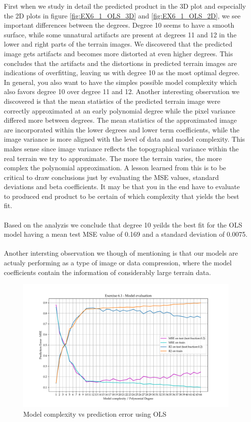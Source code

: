 \documentclass[11pt, a4paper]{article}
\begin{document}
First when we study in detail the predicted product in the 3D plot and especially the 2D plots in figure \ref{fig:EX6_1_OLS_3D} and \ref{fig:EX6_1_OLS_2D}, we see important differences between the degrees.
Degree 10 seems to have a smooth surface, while some unnatural artifacts are present at degrees 11 and 12 in the lower and right parts of the terrain images. We discovered that the predicted image gets artifacts and becomes more distorted at even higher degrees.
This concludes that the artifacts and the distortions in predicted terrain images are indications of overfitting, leaving us with degree 10 as the most optimal degree. In general, you also want to have
the simples possible model complexity which also favors degree 10 over degree 11 and 12.
Another interesting observation we discovered is that the mean statistics of the predicted terrain image were correctly approximated at an early polynomial degree while the pixel variance differed more between degrees.
The mean statistics of the approximated image are incorporated within the lower degrees and lower term coefficients, while the image variance is more aligned with the level of data and model complexity.
This makes sense since image variance reflects the topographical variance within the real terrain we try to approximate. The more the terrain varies, the more complex the polynomial approximation.
A lesson learned from this is to be critical to draw conclusions just by evaluating the MSE values, standard deviations and beta coefficients. It may be that you in the end have to
evaluate to produced end product to be certain of which complexity that yields the best fit.
\\\\
Based on the analyzis we conclude that degree 10 yeilds the best fit for the OLS model having a mean test MSE value of 0.169 and a standard deviation of 0.0075.
\\\\
Another intersting observation we though of mentioning is that our models are actualy performing as a type of image or data compression, where the model coefficients contain the information of considerably large terrain data.

\begin{figure}
  \centering
  \hspace*{-2cm}
  \includegraphics[scale=0.75]{figures/EX6_EX1_OLS_evaluattion.pdf}
  \caption{Model complexity vs prediction error using OLS}
  \label{fig:EX6_1_OLS_fit}
\end{figure}
\end{document}
